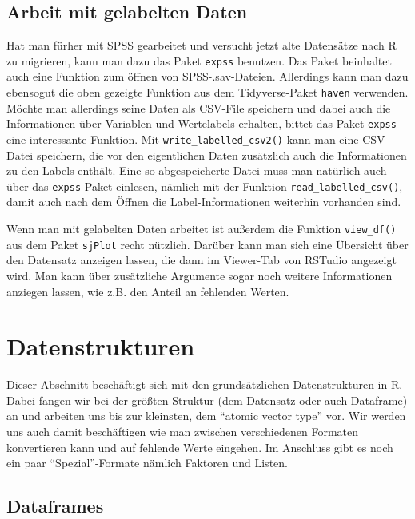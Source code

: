 \documentclass[
]{book}
\begin{document}
\hypertarget{work_labelled}{%
\subsection{Arbeit mit gelabelten Daten}\label{work_labelled}}

Hat man fürher mit SPSS gearbeitet und versucht jetzt alte Datensätze nach R zu migrieren, kann man dazu das Paket \texttt{expss} benutzen. Das Paket beinhaltet auch eine Funktion zum öffnen von SPSS-.sav-Dateien. Allerdings kann man dazu ebensogut die oben gezeigte Funktion aus dem Tidyverse-Paket \texttt{haven} verwenden. Möchte man allerdings seine Daten als CSV-File speichern und dabei auch die Informationen über Variablen und Wertelabels erhalten, bittet das Paket \texttt{expss} eine interessante Funktion. Mit \texttt{write\_labelled\_csv2()} kann man eine CSV-Datei speichern, die vor den eigentlichen Daten zusätzlich auch die Informationen zu den Labels enthält. Eine so abgespeicherte Datei muss man natürlich auch über das \texttt{expss}-Paket einlesen, nämlich mit der Funktion \texttt{read\_labelled\_csv()}, damit auch nach dem Öffnen die Label-Informationen weiterhin vorhanden sind.

Wenn man mit gelabelten Daten arbeitet ist außerdem die Funktion \texttt{view\_df()} aus dem Paket \texttt{sjPlot} recht nützlich. Darüber kann man sich eine Übersicht über den Datensatz anzeigen lassen, die dann im Viewer-Tab von RSTudio angezeigt wird. Man kann über zusätzliche Argumente sogar noch weitere Informationen anziegen lassen, wie z.B. den Anteil an fehlenden Werten.

\hypertarget{datenstrukturen}{%
\section{Datenstrukturen}\label{datenstrukturen}}

Dieser Abschnitt beschäftigt sich mit den grundsätzlichen Datenstrukturen in R. Dabei fangen wir bei der größten Struktur (dem Datensatz oder auch Dataframe) an und arbeiten uns bis zur kleinsten, dem ``atomic vector type'' vor. Wir werden uns auch damit beschäftigen wie man zwischen verschiedenen Formaten konvertieren kann und auf fehlende Werte eingehen. Im Anschluss gibt es noch ein paar ``Spezial''-Formate nämlich Faktoren und Listen.

\hypertarget{dataframes}{%
\subsection{Dataframes}\label{dataframes}}
\end{document}
